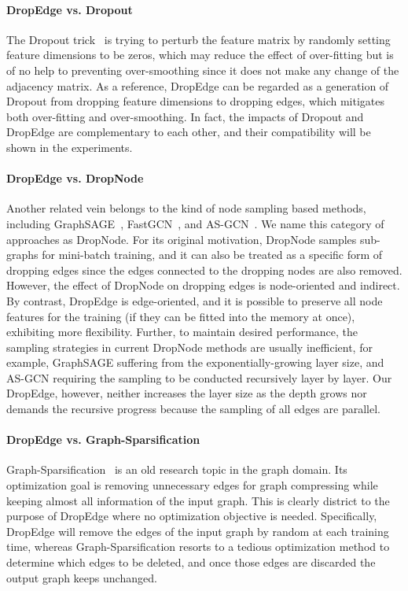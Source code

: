 \documentclass{article}
\begin{document}
\paragraph{DropEdge vs. Dropout}
The Dropout trick~\citep{Hinton2012} is trying to perturb the feature matrix by randomly setting feature dimensions to be zeros, which may reduce the effect of over-fitting but is of no help to preventing over-smoothing since it does not make any change of the adjacency matrix. As a reference, DropEdge can be regarded as a generation of Dropout from dropping feature dimensions to dropping edges, which mitigates both over-fitting and over-smoothing. In fact, the impacts of Dropout and DropEdge are complementary to each other, and their compatibility will be shown in the experiments.

\paragraph{DropEdge vs. DropNode}
Another related vein belongs to the kind of node sampling based methods, including GraphSAGE~\citep{hamilton2017inductive}, FastGCN~\citep{chen2018fastgcn}, and AS-GCN~\citep{Huang2018}. We name this category of approaches as DropNode. For its original motivation, DropNode samples sub-graphs for mini-batch training, and it can also be treated as a specific form of dropping edges since the edges connected to the dropping nodes are also removed. However, the effect of DropNode on dropping edges is node-oriented and indirect. By contrast, DropEdge is edge-oriented, and it is possible to preserve all node features for the training (if they can be fitted into the memory at once), exhibiting more flexibility. Further, to maintain desired performance, the sampling strategies in current DropNode methods are usually inefficient, for example, GraphSAGE suffering from the exponentially-growing layer size, and AS-GCN requiring the sampling to be conducted recursively layer by layer. Our DropEdge, however, neither increases the layer size as the depth grows nor demands the recursive progress because the sampling of all edges are parallel.


\paragraph{DropEdge vs. Graph-Sparsification}
Graph-Sparsification~\citep{eppstein1997sparsification} is an old research topic in the graph domain. Its optimization goal is removing unnecessary edges for graph compressing while keeping almost all information of the input graph. This is clearly district to the purpose of DropEdge where no optimization objective is needed. Specifically, DropEdge will remove the edges of the input graph by random at each training time, whereas Graph-Sparsification resorts to a tedious optimization method  to determine which edges to be deleted, and once those edges are discarded the output graph keeps unchanged.
\end{document}
